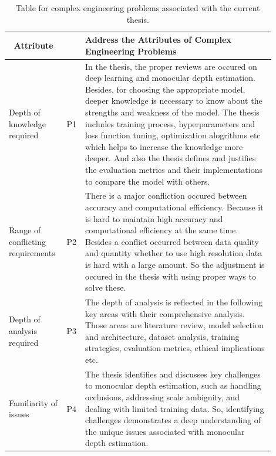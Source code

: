 \documentclass[a4paper,12pt,oneside]{book}
\begin{document}
\begin{table}[!htb]
\centering
\begin{threeparttable}
\captionsetup{font=small}
\caption{Table for complex engineering problems associated with the current thesis.}
\label{tab:test}
\small %

\begin{tabular}{|p{0.20\linewidth}|p{0.03\linewidth}|p{0.67\linewidth}|}
\hline
\multicolumn{1}{|c|}{\textbf{Attribute}} & {\textbf{ }} & {\textbf{Address the Attributes of Complex Engineering Problems
}} \\  
\hline
Depth of knowledge required & P1 &
In the thesis, the proper reviews are occured on deep learning and monocular depth estimation. Besides, for choosing the appropriate model, deeper knowledge is necessary to know about the strengths and weakness of the model. The thesis includes training process, hyperparameters and loss function tuning, optimization alogrithms etc which helps to increase the knowledge more deeper. And also the thesis defines and justifies the evaluation metrics and their implementations to compare the model with others.\\
\hline

Range of conflicting requirements & P2 &

There is a major confliction occured between accuracy and computational efficiency. Because it is hard to maintain high accuracy and computational efficiency at the same time. Besides a conflict occurred between data quality and quantity whether to use high resolution data is hard with a large amount. So the adjustment is occured in the thesis with using proper ways to solve these. \\ \hline

Depth of analysis required & P3 &
The depth of analysis is reflected in the following key areas with their comprehensive analysis. Those areas are literature review, model selection and architecture, dataset analysis, training strategies, evaluation metrics, ethical implications etc.
 \\ \hline




Familiarity of issues & P4 &

The thesis identifies and discusses key challenges to monocular depth estimation, such as handling occlusions, addressing scale ambiguity, and dealing with limited training data. So, identifying challenges demonstrates a deep understanding of the unique issues associated with monocular depth estimation.  \\ 
\hline


\end{tabular}
\end{threeparttable}
\end{table}
\end{document}
